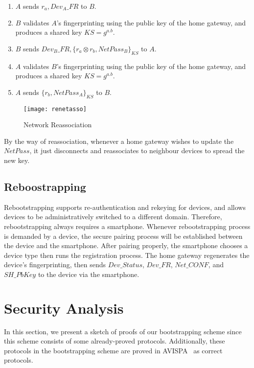 \begin{enumerate}
\item $A$ sends $r_a, Dev_{A}\_FR$ to $B$. 
\item $B$ validates $A$'s fingerprinting using the public key of the home gateway, and produces a shared key $KS = g^{a.b}$.
\item $B$ sends $Dev_{B}\_FR,\{r_a \otimes r_b, NetPass_B \}_{KS}$ to $A$.
\item $A$ validates $B$'s fingerprinting using the public key of the home gateway, and produces a shared key $KS = g^{a.b}$.
\item $A$ sends $\{r_b,NetPass_A\}_{KS}$ to $B$.
\end{enumerate}


\begin{figure}
  \centering
  \texttt{[image: renetasso]}
  \caption{Network Reassociation}
  \label{renetasso}
\end{figure}

By the way of reassociation, whenever a home gateway wishes to update the $NetPass$, it just disconnects and reassociates to neighbour devices to spread the new key. 

\subsection{Reboostrapping}

Rebootstrapping supports re-authentication and rekeying for devices, and allows devices to be administratively switched to a different domain. Therefore, rebootstrapping always requires a smartphone. Whenever rebootstrapping process is demanded by a device, the secure pairing process will be established between the device and the smartphone. After pairing properly, the smartphone chooses a device type then runs the registration process. The home gateway regenerates the device's fingerprinting, then sends $Dev\_Status$, $Dev\_FR$, $Net\_CONF$, and $SH\_PbKey$ to the device via the smartphone. 
 
\section{Security Analysis}\label{validation}

In this section, we present a sketch of proofs of our bootstrapping scheme since this scheme consists of some already-proved protocols. Additionally, these protocols in the bootstrapping scheme are proved in AVISPA~\cite{Armando:2005:ATA:2153230.2153265} as correct protocols. 

